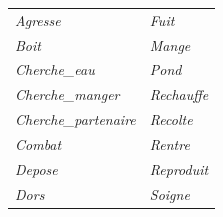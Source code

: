 \documentclass[french]{report}
\begin{document}
	\begin{center}
		\begin{tabular}{ll}
			\textit{Agresse} &\textit{Fuit}\\ 
			\textit{Boit}&\textit{Mange}\\ 
			\textit{Cherche\_eau}&\textit{Pond}\\ 
			\textit{Cherche\_manger}&\textit{Rechauffe}\\ 
			\textit{Cherche\_partenaire}&\textit{Recolte}\\ 
			\textit{Combat}&\textit{Rentre}\\ 
			\textit{Depose}&\textit{Reproduit}\\ 
			\textit{Dors}&\textit{Soigne}\\ 
		\end{tabular}\\


\end{center}
\end{document}

